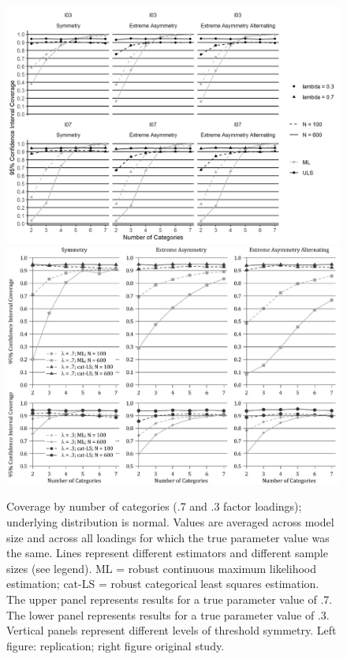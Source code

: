 \documentclass[10,a4paperpaper,]{article}
\begin{document}
\begin{figure}
\includegraphics[width=0.49\linewidth]{./figures/fig_6} \includegraphics[width=0.49\linewidth]{./figures/fig6_original} \caption{Coverage by number of categories (.7 and .3 factor loadings); underlying distribution is normal. Values are averaged across model size and across all loadings for which the true parameter value was the same. Lines represent different estimators and different sample sizes (see legend). ML = robust continuous maximum likelihood estimation; cat-LS = robust categorical least squares estimation. The upper panel represents results for a true parameter value of .7. The lower panel represents results for a true parameter value of .3. Vertical panels represent different levels of threshold symmetry. Left figure: replication; right figure original study.}\label{fig:fig6}
\end{figure}
\end{document}
